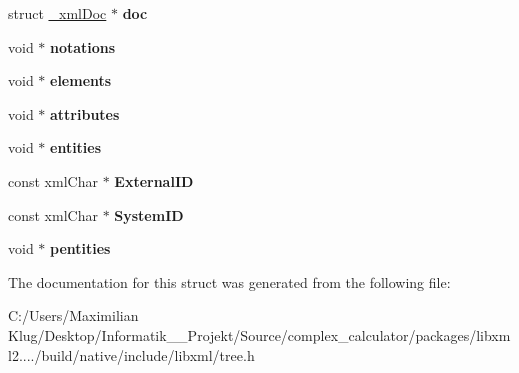 \begin{DoxyCompactItemize}
struct \mbox{\hyperlink{struct__xml_doc}{\+\_\+xml\+Doc}} $\ast$ {\bfseries doc}
\item 
\mbox{\label{struct__xml_dtd_ad534175a81261c5f1ad7ea6392072c21}} 
void $\ast$ {\bfseries notations}
\item 
\mbox{\label{struct__xml_dtd_a9a9f0ad6fe0df90737be11e9afedbcdd}} 
void $\ast$ {\bfseries elements}
\item 
\mbox{\label{struct__xml_dtd_af7ff0b9a49fa0bca079e52c48d8cfb4f}} 
void $\ast$ {\bfseries attributes}
\item 
\mbox{\label{struct__xml_dtd_ad015489c07cded87195e5eeb0f6cb0b7}} 
void $\ast$ {\bfseries entities}
\item 
\mbox{\label{struct__xml_dtd_ae44f8a5ca40e8df30f4901182278b00d}} 
const xml\+Char $\ast$ {\bfseries External\+ID}
\item 
\mbox{\label{struct__xml_dtd_adf2a9eb2fe7b1129c45a78432a86e390}} 
const xml\+Char $\ast$ {\bfseries System\+ID}
\item 
\mbox{\label{struct__xml_dtd_a24703d9ba5942d4cb0cf8b2c19f63243}} 
void $\ast$ {\bfseries pentities}
\end{DoxyCompactItemize}


The documentation for this struct was generated from the following file\+:\begin{DoxyCompactItemize}
\item 
C\+:/\+Users/\+Maximilian Klug/\+Desktop/\+Informatik\+\_\+\_\+\+Projekt/\+Source/complex\+\_\+calculator/packages/libxml2..../build/native/include/libxml/tree.\+h\end{DoxyCompactItemize}
